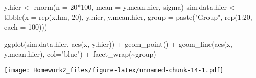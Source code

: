 \documentclass[
]{article}
\newenvironment{Shaded}{\begin{snugshade}}{\end{snugshade}}
\newcommand{\AttributeTok}[1]{\textcolor[rgb]{0.77,0.63,0.00}{#1}}
\newcommand{\DecValTok}[1]{\textcolor[rgb]{0.00,0.00,0.81}{#1}}
\newcommand{\FunctionTok}[1]{\textcolor[rgb]{0.00,0.00,0.00}{#1}}
\newcommand{\NormalTok}[1]{#1}
\newcommand{\OtherTok}[1]{\textcolor[rgb]{0.56,0.35,0.01}{#1}}
\newcommand{\SpecialCharTok}[1]{\textcolor[rgb]{0.00,0.00,0.00}{#1}}
\newcommand{\StringTok}[1]{\textcolor[rgb]{0.31,0.60,0.02}{#1}}
\begin{document}
\begin{Shaded}
\begin{Highlighting}[]
\NormalTok{y.hier }\OtherTok{\textless{}{-}} \FunctionTok{rnorm}\NormalTok{(}\AttributeTok{n =} \DecValTok{20}\SpecialCharTok{*}\DecValTok{100}\NormalTok{, }\AttributeTok{mean =}\NormalTok{ y.mean.hier, sigma)}
\NormalTok{sim.data.hier }\OtherTok{\textless{}{-}} \FunctionTok{tibble}\NormalTok{(}\AttributeTok{x =} \FunctionTok{rep}\NormalTok{(x.hm, }\DecValTok{20}\NormalTok{), }
\NormalTok{                        y.hier, y.mean.hier, }
                        \AttributeTok{group =} \FunctionTok{paste}\NormalTok{(}\StringTok{"Group"}\NormalTok{, }\FunctionTok{rep}\NormalTok{(}\DecValTok{1}\SpecialCharTok{:}\DecValTok{20}\NormalTok{, }\AttributeTok{each =} \DecValTok{100}\NormalTok{)))}

\FunctionTok{ggplot}\NormalTok{(sim.data.hier, }\FunctionTok{aes}\NormalTok{(x, y.hier)) }\SpecialCharTok{+} 
  \FunctionTok{geom\_point}\NormalTok{() }\SpecialCharTok{+} \FunctionTok{geom\_line}\NormalTok{(}\FunctionTok{aes}\NormalTok{(x, y.mean.hier), }\AttributeTok{col=}\StringTok{"blue"}\NormalTok{) }\SpecialCharTok{+} 
  \FunctionTok{facet\_wrap}\NormalTok{(}\SpecialCharTok{\textasciitilde{}}\NormalTok{group)}
\end{Highlighting}
\end{Shaded}

\texttt{[image: Homework2\_files/figure-latex/unnamed-chunk-14-1.pdf]}
\end{document}
